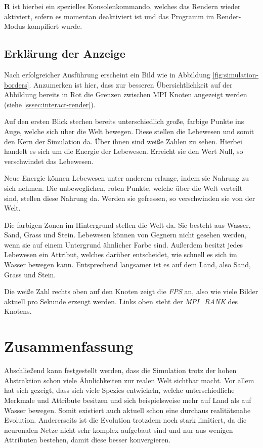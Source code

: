 \documentclass[course=erap]{aspdoc}
\begin{document}
\textbf{R} ist hierbei ein spezielles Konsolenkommando, welches das Rendern wieder aktiviert, sofern es momentan deaktiviert ist und das Programm im Render-Modus kompiliert wurde.

\subsection{Erklärung der Anzeige}
Nach erfolgreicher Ausführung erscheint ein Bild wie in Abbildung \ref{fig:simulation-borders}. Anzumerken ist hier, dass zur besseren Übersichtlichkeit auf der Abbildung bereits in Rot die Grenzen zwischen MPI Knoten angezeigt werden (siehe \ref{sssec:interact-render}).

Auf den ersten Blick stechen bereits unterschiedlich große, farbige Punkte ins Auge, welche sich über die Welt bewegen. Diese stellen die Lebewesen und somit den Kern der Simulation da. Über ihnen sind weiße Zahlen zu sehen. Hierbei handelt es sich um die Energie der Lebewesen. Erreicht sie den Wert Null, so verschwindet das Lebewesen.

Neue Energie können Lebewesen unter anderem erlange, indem sie Nahrung zu sich nehmen. Die unbeweglichen, roten Punkte, welche über die Welt verteilt sind, stellen diese Nahrung da. Werden sie gefressen, so verschwinden sie von der Welt.

Die farbigen Zonen im Hintergrund stellen die Welt da. Sie besteht aus Wasser, Sand, Grass und Stein. Lebewesen können von Gegnern nicht gesehen werden, wenn sie auf einem Untergrund ähnlicher Farbe sind. Außerdem besitzt jedes Lebewesen ein Attribut, welches darüber entscheidet, wie schnell es sich im Wasser bewegen kann. Entsprechend langsamer ist es auf dem Land, also Sand, Grass und Stein.

Die weiße Zahl rechts oben auf den Knoten zeigt die \emph{FPS} an, also wie viele Bilder aktuell pro Sekunde erzeugt werden. Links oben steht der \emph{MPI\_RANK} des Knotens.


\section{Zusammenfassung}
Abschließend kann festgestellt werden, dass die Simulation trotz der hohen Abstraktion schon viele Ähnlichkeiten zur realen Welt sichtbar macht. Vor allem hat sich gezeigt, dass sich viele Spezies entwickeln, welche unterschiedliche Merkmale und Attribute besitzen und sich beispielsweise mehr auf Land als auf Wasser bewegen. Somit existiert auch aktuell schon eine durchaus realitätsnahe Evolution. Andererseits ist die Evolution trotzdem noch stark limitiert, da die neuronalen Netze nicht sehr komplex aufgebaut sind und nur aus wenigen Attributen bestehen, damit diese besser konvergieren.
\end{document}
